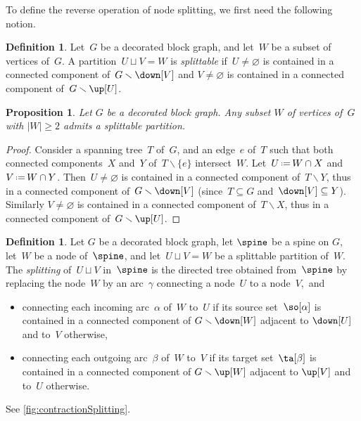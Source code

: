\documentclass{amsart}
\newtheorem{proposition}[theorem]{Proposition}
\theoremstyle{definition}
\newtheorem{definition}[theorem]{Definition}
\newcommand{\ssm}{\smallsetminus} %
\newcommand{\eqdef}{\mbox{\,\raisebox{0.2ex}{\scriptsize\ensuremath{\mathrm:}}\ensuremath{=}\,}} %
\newcommand{\darkblue}{\color{darkblue}} %
\newcommand{\defn}[1]{\textsl{\darkblue #1}} %
\begin{document}
To define the reverse operation of node splitting, we first need the following notion.

\begin{definition}
  \label{def:splittable}
  Let~$G$ be a decorated block graph, and let~$W$ be a subset of vertices of~$G$.
  A partition~$U \sqcup V = W$ is \defn{splittable} if~$U \ne \varnothing$ is contained in a connected component of~$G \ssm \down[V]$ and $V \ne \varnothing$ is contained in a connected component of~$G \ssm \up[U]$.
\end{definition}

\begin{proposition}
  \label{prop:splittablePartitions}
  Let $G$ be a decorated block graph. Any subset $W$ of vertices of~$G$ with $|W| \ge 2$ admits a splittable partition.
\end{proposition}

\begin{proof} 
  Consider a spanning tree~$T$ of~$G$, and an edge~$e$ of~$T$ such that both connected components~$X$ and~$Y$ of~$T \ssm \{e\}$ intersect~$W$.
  Let~$U \eqdef W \cap X$ and~$V \eqdef W \cap Y$.
  Then~$U \ne \varnothing$ is contained in a connected component of~$T \ssm Y$, thus in a connected component of~$G \ssm \down[V]$ (since~$T \subseteq G$ and~$\down[V] \subseteq Y$).
  Similarly $V \ne \varnothing$ is contained in a connected component of~$T \ssm X$, thus in a connected component of~$G \ssm \up[U]$.
\end{proof}

\begin{definition}
  \label{def:nodeSplitting} 
  Let $G$ be a decorated block graph, let $\spine$ be a spine on $G$, let~$W$ be a node of~$\spine$, and let~$U \sqcup V = W$ be a splittable partition of~$W$.
  The \defn{splitting} of~$U \sqcup V$ in~$\spine$ is the directed tree obtained from~$\spine$ by replacing the node~$W$ by an arc~$\gamma$ connecting a node~$U$ to a node~$V$,~and
  \begin{itemize}
    \item connecting each incoming arc~$\alpha$ of~$W$ to~$U$ if its source set~$\so[\alpha]$ is contained in a connected component of $G \ssm \down[W]$ adjacent to $\down[U]$ and to~$V$ otherwise, 
    \item connecting each outgoing arc~$\beta$ of~$W$ to~$V$ if its target set~$\ta[\beta]$ is contained in a connected component of $G \ssm \up[W]$ adjacent to $\up[V]$ and to~$U$ otherwise.
  \end{itemize}
  See \cref{fig:contractionSplitting}.
\end{definition}
\end{document}
